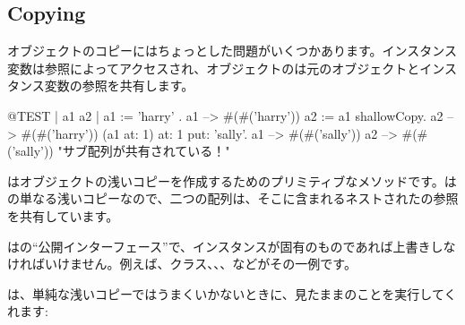 \documentclass[a4paper,10pt,twoside]{book}
\begin{document}
\subsection{Copying}

オブジェクトのコピーにはちょっとした問題がいくつかあります。インスタンス変数は参照によってアクセスされ、オブジェクトのは元のオブジェクトとインスタンス変数の参照を共有します。

\begin{code}{@TEST | a1 a2 |}
a1 := { { 'harry' } }.
a1 --> #(#('harry'))
a2 := a1 shallowCopy.
a2 --> #(#('harry'))
(a1 at: 1) at: 1 put: 'sally'.
a1 --> #(#('sally'))
a2 --> #(#('sally'))    "サブ配列が共有されている！"
\end{code}

はオブジェクトの浅いコピーを作成するためのプリミティブなメソッドです。はの単なる浅いコピーなので、二つの配列は、そこに含まれるネストされたの参照を共有しています。

はの``公開インターフェース''で、インスタンスが固有のものであれば上書きしなければいけません。例えば、クラス、、、などがその一例です。

は、単純な浅いコピーではうまくいかないときに、見たままのことを実行してくれます:
\end{document}
